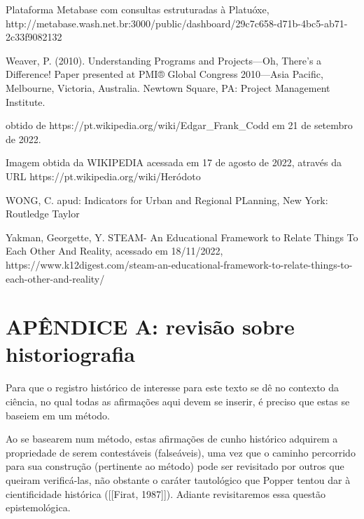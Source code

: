 \begin{flushleft}
[WASH, 2023] Plataforma Metabase com consultas estruturadas à Platuóxe, http://metabase.wash.net.br:3000/public/dashboard/29c7c658-d71b-4bc5-ab71-2c33f9082132
\end{flushleft}


\begin{flushleft}
[Weaver, 2010] Weaver, P. (2010). Understanding Programs and Projects—Oh, There's a Difference! Paper presented at PMI® Global Congress 2010—Asia Pacific, Melbourne, Victoria, Australia. Newtown Square, PA: Project Management Institute.
\end{flushleft}


\begin{flushleft}
 obtido de https://pt.wikipedia.org/wiki/Edgar\_Frank\_Codd em 21 de setembro de 2022.
\end{flushleft}


\begin{flushleft}
[WIKIPEDIA, 2022] Imagem obtida da WIKIPEDIA acessada em 17 de agosto de 2022, através da URL https://pt.wikipedia.org/wiki/Heródoto
\end{flushleft}


\begin{flushleft}
[WONG, 2006] WONG, C. apud: Indicators for Urban and Regional PLanning, New York: Routledge Taylor 
\end{flushleft}


\begin{flushleft}
[YAKMAN, 2019] Yakman, Georgette, Y. STEAM- An Educational Framework to Relate Things To Each Other And Reality, acessado em 18/11/2022, https://www.k12digest.com/steam-an-educational-framework-to-relate-things-to-each-other-and-reality/
\end{flushleft}


\chapter[APÊNDICE A: revisão sobre historiografia]{APÊNDICE A: revisão sobre historiografia}\label{APÊNDICE A: revisão sobre historiografia}
Para que o registro histórico de interesse para este texto se dê no contexto da ciência, no qual todas as afirmações aqui devem se inserir, é preciso que estas se baseiem em um método.

Ao se basearem num método, estas afirmações de cunho histórico adquirem a propriedade de serem contestáveis (falseáveis), uma vez que o caminho percorrido para sua construção (pertinente ao método) pode ser revisitado por outros que queiram verificá-las, não obstante o caráter tautológico que Popper tentou dar à cientificidade histórica  ([[Firat, 1987]]). Adiante revisitaremos essa questão epistemológica.

